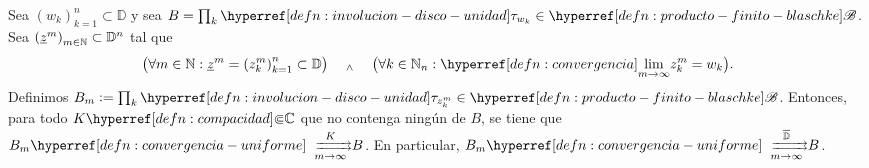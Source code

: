 \begin{lem}\label{lem:convergencia-ceros-imp-convergencia-prod-finito-blaschke}
    Sea $\left(w_k\right)_{k=1}^n \subset \mathbb{D}$ y sea $B = \prod_{k} \exhyperref[defn:involucion-disco-unidad]{involucion-disco-unidad}{\tau_{w_k}} \in \exhyperref[defn:producto-finito-blaschke]{producto-finito-blaschke}{\mathscr{B}}$. Sea $\left(\underline{z}^m\right)_{m \in \mathbb{N}} \subset \mathbb{D}^n$ tal que
    \[
    \bigl(\forall m \in \N : \underline{z}^m = \left(z_k^m\right)_{k=1}^n \subset \mathbb{D}\bigr) \quad \we \quad \bigl(\forall k \in \N_n : \exhyperref[defn:convergencia]{convergencia}{\lim_{m \to \infty}} z_k^m = w_k\bigr).
    \]
    Definimos $B_m \defeq \prod_{k} \exhyperref[defn:involucion-disco-unidad]{involucion-disco-unidad}{\tau_{z_k^m}} \in \exhyperref[defn:producto-finito-blaschke]{producto-finito-blaschke}{\mathscr{B}}$. Entonces, para todo $K \exhyperref[defn:compacidad]{compacidad}{\Subset} \C$ que no contenga ningún  de $B$, se tiene que $B_m \exhyperref[defn:convergencia-uniforme]{convergencia-uniforme}{\xrightrightarrows[m \to \infty]{K}} B$.
    En particular, $B_m \exhyperref[defn:convergencia-uniforme]{convergencia-uniforme}{\xrightrightarrows[m \to \infty]{\bar{\mathbb{D}}}} B$.
\end{lem}
